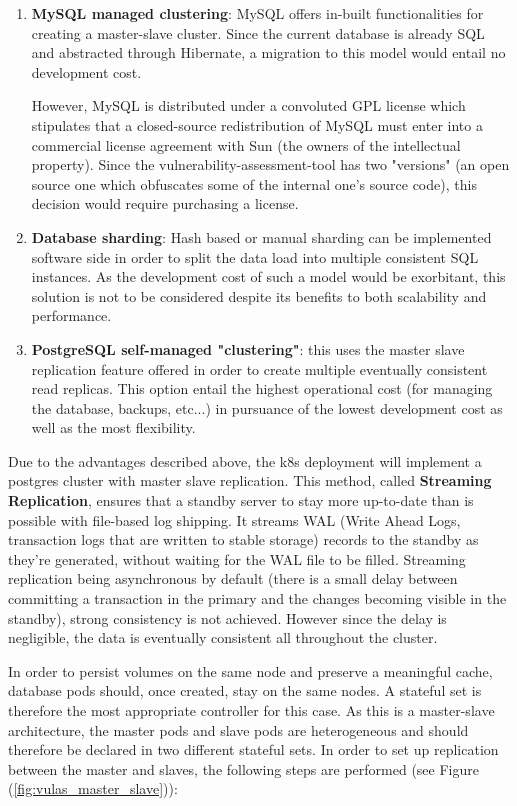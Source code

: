 \documentclass[11pt]{article}
\begin{document}
\begin{enumerate}
    \item \textbf{MySQL managed clustering}: MySQL offers in-built functionalities for creating a master-slave cluster. Since the current database is already SQL and abstracted through Hibernate, a migration to this model would entail no development cost. 
    
    However, MySQL is distributed under a convoluted GPL license which stipulates that a closed-source redistribution of MySQL must enter into a commercial license agreement with Sun (the owners of the intellectual property). Since the vulnerability-assessment-tool has two "versions" (an open source one which obfuscates some of the internal one's source code), this decision would require purchasing a license.

    \item \textbf{Database sharding}: Hash based or manual sharding can be implemented software side in order to split the data load into multiple consistent SQL instances. As the development cost of such a model would be exorbitant, this solution is not to be considered despite its benefits to both scalability and performance.
    
    \item \textbf{PostgreSQL self-managed "clustering"}: this uses the master slave replication feature offered in order to create multiple eventually consistent read replicas. This option entail the highest operational cost (for managing the database, backups, etc...) in pursuance of the lowest development cost as well as the most flexibility.
\end{enumerate}

\label{sec:vulas_db_replication}
Due to the advantages described above, the k8s deployment will implement a postgres cluster with master slave replication. This method, called \textbf{Streaming Replication}, ensures that a standby server to stay more up-to-date than is possible with file-based log shipping. It streams WAL (Write Ahead Logs, transaction logs that are written to stable storage) records to the standby as they're generated, without waiting for the WAL file to be filled. Streaming replication being asynchronous by default (there is a small delay between committing a transaction in the primary and the changes becoming visible in the standby), strong consistency is not achieved. However since the delay is negligible, the data is eventually consistent all throughout the cluster.
 
In order to persist volumes on the same node and preserve a meaningful cache, database pods should, once created, stay on the same nodes. A stateful set is therefore the most appropriate controller for this case. As this is a master-slave architecture, the master pods and slave pods are heterogeneous and should therefore be declared in two different stateful sets. In order to set up replication between the master and slaves, the following steps are performed (see Figure (\ref{fig:vulas_master_slave})):
\end{document}
